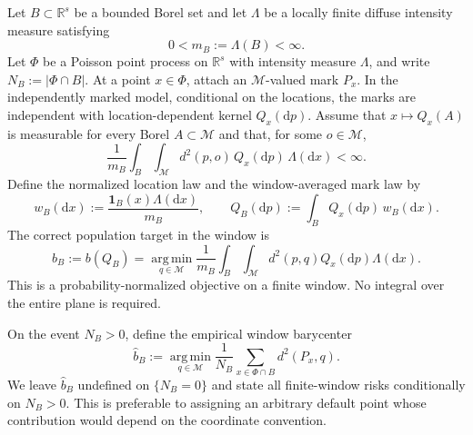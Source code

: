 \documentclass[11pt,a4paper]{article}
\theoremstyle{remark}
\newcommand{\R}{\mathbb R}
\newcommand{\M}{\mathcal M}
\newcommand{\argmin}{\operatorname*{arg\,min}}
\begin{document}
Let \(B\subset\R^s\) be a bounded Borel set and let \(\Lambda\) be a locally finite diffuse intensity measure satisfying
\begin{equation}
\label{eq:m-def}
 0<m_B:=\Lambda(B)<\infty.
\end{equation}
Let \(\Phi\) be a Poisson point process on \(\R^s\) with intensity measure \(\Lambda\), and write \(N_B:=|\Phi\cap B|\).  At a point \(x\in\Phi\), attach an \(\M\)-valued mark \(P_x\).  In the independently marked model, conditional on the locations, the marks are independent with location-dependent kernel \(Q_x(\mathrm dp)\).  Assume that \(x\mapsto Q_x(A)\) is measurable for every Borel \(A\subset\M\) and that, for some \(o\in\M\),
\begin{equation}
\label{eq:second-moment-kernel}
 \frac1{m_B}\int_B\int_{\M}d^2(p,o)\,Q_x(\mathrm dp)\,\Lambda(\mathrm dx)<\infty.
\end{equation}
Define the normalized location law and the window-averaged mark law by
\begin{equation}
\label{eq:w-and-QB}
 w_B(\mathrm dx):=\frac{\mathbf1_B(x)\Lambda(\mathrm dx)}{m_B},
 \qquad
 Q_B(\mathrm dp):=\int_B Q_x(\mathrm dp)\,w_B(\mathrm dx).
\end{equation}
The correct population target in the window is
\begin{equation}
\label{eq:window-population-barycenter}
 b_B:=b(Q_B)
 =\argmin_{q\in\M}
 \frac1{m_B}\int_B\int_{\M}d^2(p,q)Q_x(\mathrm dp)\Lambda(\mathrm dx).
\end{equation}
This is a probability-normalized objective on a finite window.  No integral over the entire plane is required.

On the event \(N_B>0\), define the empirical window barycenter
\begin{equation}
\label{eq:window-empirical-barycenter}
 \widehat b_B
 :=\argmin_{q\in\M}\frac1{N_B}\sum_{x\in\Phi\cap B}d^2(P_x,q).
\end{equation}
We leave \(\widehat b_B\) undefined on \(\{N_B=0\}\) and state all finite-window risks conditionally on \(N_B>0\).  This is preferable to assigning an arbitrary default point whose contribution would depend on the coordinate convention.
\end{document}
